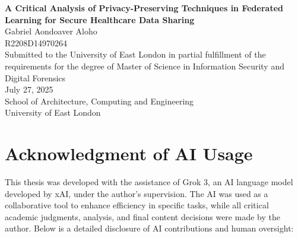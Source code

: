 \documentclass[12pt]{report}
\begin{document}
\begin{titlepage}
    \centering
    \vspace*{1cm}
    {\LARGE \textbf{A Critical Analysis of Privacy-Preserving Techniques in Federated Learning for Secure Healthcare Data Sharing}} \\[1cm]
    {\large Gabriel Aondoaver Aloho} \\[0.5cm]
    {\large R2208D14970264} \\[0.5cm]
    {\large Submitted to the University of East London in partial fulfillment of the requirements for the degree of Master of Science in Information Security and Digital Forensics} \\[1cm]
    {\large July 27, 2025} \\[0.5cm]
    {\large School of Architecture, Computing and Engineering} \\[0.5cm]
    {\large University of East London}
\end{titlepage}

\tableofcontents
\listoftables
\clearpage

\onehalfspacing

\begin{abstract}
\textit{
This study critically analyzes privacy-preserving techniques in Federated Learning (FL) for secure healthcare data sharing, emphasizing compliance with data protection regulations such as GDPR and HIPAA. A meta-analysis of 20 peer-reviewed studies (2015–2025) provides a broad foundation, with an in-depth review of 10 exemplary works and an automated analysis of 8 studies using a Python-based pipeline. An extended analysis of 12 studies further enriches the findings. The research evaluates Differential Privacy (DP), Homomorphic Encryption (HE), and hybrid models, assessing their privacy strength, computational efficiency, and regulatory compliance. Findings indicate that while these techniques offer robust defenses against privacy attacks, they face challenges in computational overhead, model accuracy degradation, and limited compliance focus (only 25.0\% of automated studies address GDPR/HIPAA). The study proposes standardized benchmarking, simplified hybrid systems, and regulatory integration to enhance deployability in healthcare settings.}
\end{abstract}


\section*{Acknowledgment of AI Usage}
This thesis was developed with the assistance of Grok 3, an AI language model developed by xAI, under the author's supervision. The AI was used as a collaborative tool to enhance efficiency in specific tasks, while all critical academic judgments, analysis, and final content decisions were made by the author. Below is a detailed disclosure of AI contributions and human oversight:
\end{document}
